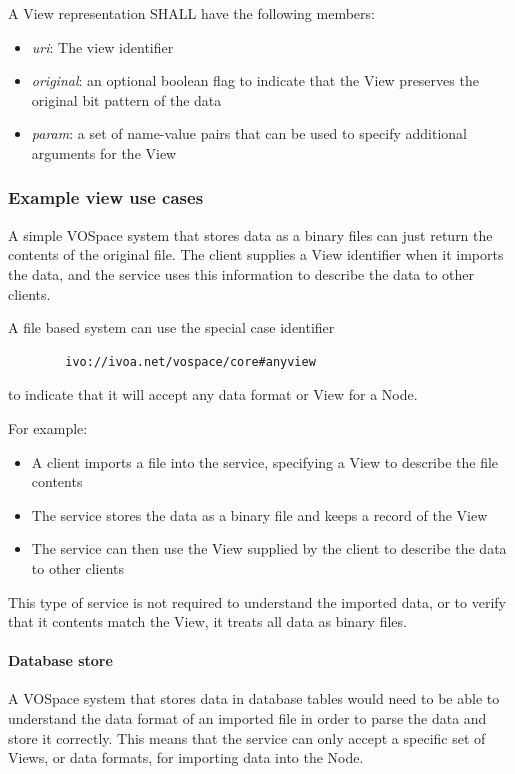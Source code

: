 \documentclass[11pt,a4paper]{ivoa}
\begin{document}
A View representation SHALL have the following members:

\begin{itemize}
    \item \emph{uri}: The view identifier
    \item \emph{original}: an optional boolean flag to indicate that the View preserves the original bit pattern of the data
    \item \emph{param}: a set of name-value pairs that can be used to specify additional arguments for the View
\end{itemize}

\subsubsection{Example view use cases}
\label{subsubsec:example view use cases}
A simple VOSpace system that stores data as a binary files can just return the contents of the original file. The client supplies a View identifier when it imports the data, and the service uses this information to describe the data to other clients.

A file based system can use the special case identifier
\begin{verbatim}
        ivo://ivoa.net/vospace/core#anyview
\end{verbatim}
to indicate that it will accept any data format or View for a Node.

For example:

\begin{itemize}
    \item A client imports a file into the service, specifying a View to describe the file contents
    \item The service stores the data as a binary file and keeps a record of the View
    \item The service can then use the View supplied by the client to describe the data to other clients
\end{itemize}

This type of service is not required to understand the imported data, or to verify that it contents match the View, it treats all data as binary files.

\paragraph{Database store}
A VOSpace system that stores data in database tables would need to be able to understand the data format of an imported file in order to parse the data and store it correctly. This means that the service can only accept a specific set of Views, or data formats, for importing data into the Node.
\end{document}
